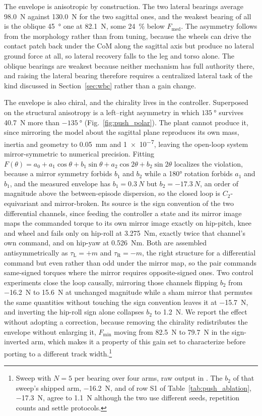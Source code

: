 \documentclass[a4paper,fleqn]{cas-dc}
\begin{document}
The envelope is anisotropic by construction. The two lateral bearings average
\SI{98.0}{N} against \SI{130.0}{N} for the two sagittal ones, and the weakest
bearing of all is the oblique \SI{45}{\degree} one at \SI{82.1}{N}, some
\SI{24}{\percent} below $F_{\text{med}}$. The asymmetry follows from the
morphology rather than from tuning, because the wheels can drive the contact
patch back under the CoM along the sagittal axis but produce no lateral ground
force at all, so lateral recovery falls to the leg and torso alone. The oblique
bearings are weakest because neither mechanism has full authority there, and
raising the lateral bearing therefore requires a centralized lateral task of the
kind discussed in Section~\ref{sec:wbc} rather than a gain change.

The envelope is also chiral, and the chirality lives in the controller.
Superposed on the structural anisotropy is a left--right asymmetry in which
$\SI{135}{\degree}$ survives \SI{40.7}{N} more than $-\SI{135}{\degree}$
(Fig.~\ref{fig:push_polar}). The plant cannot produce it, since mirroring the
model about the sagittal plane reproduces its own mass, inertia and geometry to
\SI{0.05}{mm} and \num{1e-7}, leaving the open-loop system mirror-symmetric to
numerical precision. Fitting
$F(\theta){=}a_0{+}a_1\cos\theta{+}b_1\sin\theta{+}a_2\cos2\theta{+}b_2\sin2\theta$
localizes the violation, because a mirror symmetry forbids $b_1$ and $b_2$ while
a \ang{180} rotation forbids $a_1$ and $b_1$, and the measured envelope has
$b_1{=}\SI{0.3}{N}$ but $b_2{=}\SI{-17.3}{N}$, an order of magnitude above the
between-episode dispersion, so the closed loop is $C_2$-equivariant and
mirror-broken. Its source is the sign convention of the two differential
channels, since feeding the controller a state and its mirror image maps the
commanded torque to its own mirror image exactly on hip-pitch, knee and wheel and
fails only on hip-roll at \SI{3.275}{Nm}, exactly twice that channel's own
command, and on hip-yaw at \SI{0.526}{Nm}. Both are assembled antisymmetrically
as $\tau_{\text{L}}{=}{+}m$ and $\tau_{\text{R}}{=}{-}m$, the right structure for
a differential command but even rather than odd under the mirror map, so the pair
commands same-signed torques where the mirror requires opposite-signed ones. Two
control experiments close the loop causally, mirroring those channels flipping
$b_2$ from \SI{-16.2}{N} to \SI{+15.6}{N} at unchanged magnitude while a sham
mirror that permutes the same quantities without touching the sign convention
leaves it at \SI{-15.7}{N}, and inverting the hip-roll sign alone collapses $b_2$
to \SI{+1.2}{N}. We report the effect without adopting a correction, because
removing the chirality redistributes the envelope without enlarging it,
$F_{\min}$ moving from \SI{82.5}{N} to \SI{79.7}{N} in the sign-inverted arm,
which makes it a property of this gain set to characterize before porting to a
different track width.\footnote{Sweep  with $N{=}5$ per
bearing over four arms, raw output in . The $b_2$
of that sweep's shipped arm, \SI{-16.2}{N}, and of row S1 of
Table~\ref{tab:push_ablation}, \SI{-17.3}{N}, agree to \SI{1.1}{N} although the
two use different seeds, repetition counts and settle protocols.}
\end{document}
